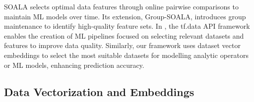 SOALA \cite{b19SOALA} selects optimal data features through online pairwise comparisons to maintain ML models over time. Its extension, Group-SOALA, introduces group maintenance to identify high-quality feature sets. In \cite{b20tfdata}, the tf.data API framework enables the creation of ML pipelines focused on selecting relevant datasets and features to improve data quality. Similarly, our framework uses dataset vector embeddings to select the most suitable datasets for modelling analytic operators or ML models, enhancing prediction accuracy.

\subsection{Data Vectorization and Embeddings}

